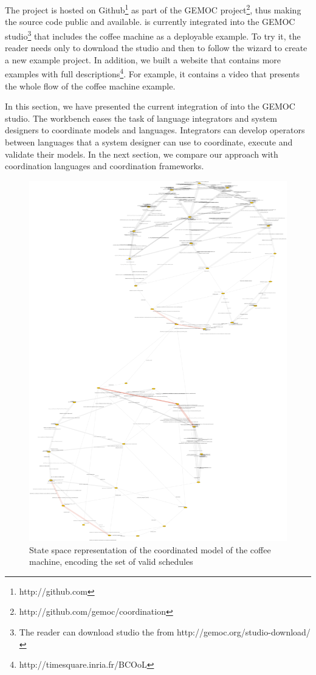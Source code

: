 The project \bcool is hosted on Github\footnote{http://github.com} as part of the GEMOC project\footnote{http://github.com/gemoc/coordination}, thus making the source code public and available. \bcool is currently integrated into the GEMOC studio\footnote{The reader can download studio the from http://gemoc.org/studio-download/} that includes the coffee machine as a deployable example. To try it, the reader needs only to download the studio and then to follow the wizard to create a new example project. In addition, we built a website that contains more examples with full descriptions\footnote{http://timesquare.inria.fr/BCOoL}. For example, it contains a video that presents the whole flow of the coffee machine example.

In this section, we have presented the current integration of \bcool into the GEMOC studio. The workbench eases the task of language integrators and system designers to coordinate models and languages. Integrators can develop operators between languages that a system designer can use to coordinate, execute and validate their models. In the next section, we compare our approach with coordination languages and coordination frameworks.  

\begin{figure}[]
	\begin{center}
		\includegraphics[width=.8\textwidth]{bcool/figs/statespace}
		\caption{State space representation of the coordinated model of the coffee machine, encoding the set of valid schedules}
		\label{fig:statespace}
	\end{center}
\end{figure}

